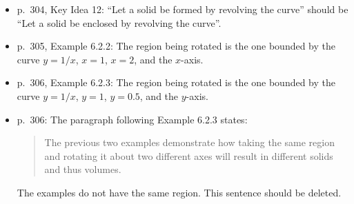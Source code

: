 \documentclass{amsart}
\begin{document}
\begin{itemize}
\begin{itemize}
\item p.\ 304, Key Idea 12: ``Let a solid be formed by revolving the curve'' should be ``Let a solid be enclosed by revolving the curve''.
\item p.\ 305, Example 6.2.2: The region being rotated is the one bounded by the curve $y=1/x$, $x=1$, $x=2$, and the $x$-axis.
\item p.\ 306, Example 6.2.3: The region being rotated is the one bounded by the curve $y=1/x$, $y=1$, $y=0.5$, and the $y$-axis.
\item p.\ 306: The paragraph following Example 6.2.3 states:
\begin{quote}
The previous two examples demonstrate how taking the same region and rotating it about two different axes will result in different solids and thus volumes.
\end{quote}
The examples do not have the same region.  This sentence should be deleted.
\end{itemize}
\end{itemize}
\end{document}
